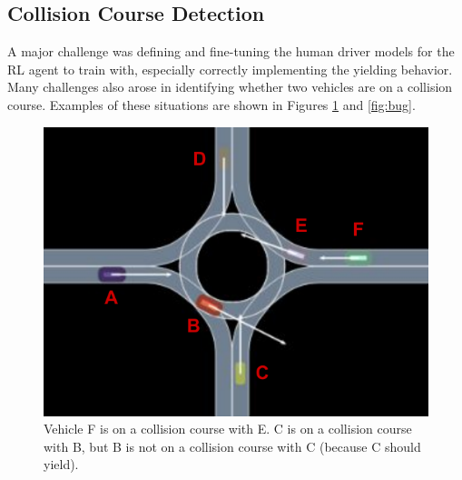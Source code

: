 \documentclass[conference]{IEEEtran}
\begin{document}
\subsection{Collision Course Detection}\label{subs:collision}
A major challenge was defining and fine-tuning the human driver models for the RL agent to train with, especially correctly implementing the yielding behavior. Many challenges also arose in identifying whether two vehicles are on a collision course. Examples of these situations are shown in Figures \ref{fig:collision} and \ref{fig:bug}.

\begin{figure}[h!]
	\centering
\includegraphics[width=0.8\linewidth]{figures/example_roundabout.pdf}
\caption{Vehicle F is on a collision course with E. C is on a collision course with B, but B is not on a collision course with C (because C should yield).}
\label{fig:collision}
\end{figure}
\end{document}
